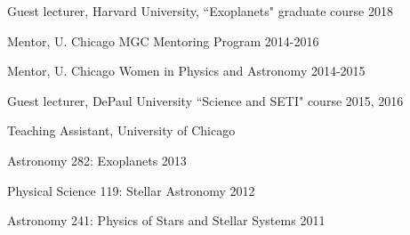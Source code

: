 \documentclass[12pt,letterpaper]{article}
\begin{document}
\begin{compactitem}[]
\item Guest lecturer, Harvard University, ``Exoplanets" graduate course \hfill 2018
\item Mentor, U. Chicago MGC Mentoring Program \hfill 2014-2016 
\item Mentor, U. Chicago Women in Physics and Astronomy \hfill2014-2015
\item Guest lecturer, DePaul University ``Science and SETI" course \hfill2015, 2016
\item Teaching Assistant, University of Chicago
	\begin{compactitem}
	\item Astronomy 282:  Exoplanets \hfill 2013
	\item Physical Science 119:  Stellar Astronomy	\hfill 2012
	\item Astronomy 241:  Physics of Stars and Stellar Systems \hfill	2011 
	\end{compactitem}
\end{compactitem}




\end{document}
